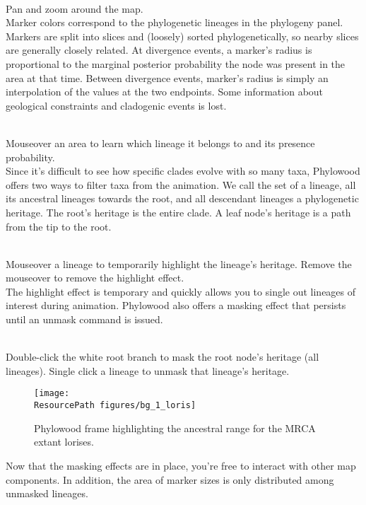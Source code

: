 \noindent \\ \impmark Pan and zoom around the map.\\

Marker colors correspond to the phylogenetic lineages in the phylogeny panel.
Markers are split into slices and (loosely) sorted phylogenetically, so nearby slices are generally closely related.
At divergence events, a marker's radius is proportional to the marginal posterior probability the node was present in the area at that time.
Between divergence events, marker's radius is simply an interpolation of the values at the two endpoints.
Some information about geological constraints and cladogenic events is lost.

\noindent \\ \impmark Mouseover an area to learn which lineage it belongs to and its presence probability. \\

Since it's difficult to see how specific clades evolve with so many taxa, Phylowood offers two ways to filter taxa from the animation.
We call the set of a lineage, all its ancestral lineages towards the root, and all descendant lineages a phylogenetic heritage.
The root's heritage is the entire clade.
A leaf node's heritage is a path from the tip to the root.

\noindent \\ \impmark Mouseover a lineage to temporarily highlight the lineage's heritage. Remove the mouseover to remove the highlight effect. \\

The highlight effect is temporary and quickly allows you to single out lineages of interest during animation.
Phylowood also offers a masking effect that persists until an unmask command is issued.

\noindent \\ \impmark Double-click the white root branch to mask the root node's heritage (all lineages). Single click a lineage to unmask that lineage's heritage. \\

\begin{figure}[H]
\centering
\texttt{[image: \\ResourcePath figures/bg\_1\_loris]}
\caption{Phylowood frame highlighting the ancestral range for the MRCA extant lorises.}
\end{figure}

Now that the masking effects are in place, you're free to interact with other map components.
In addition, the area of marker sizes is only distributed among unmasked lineages.

